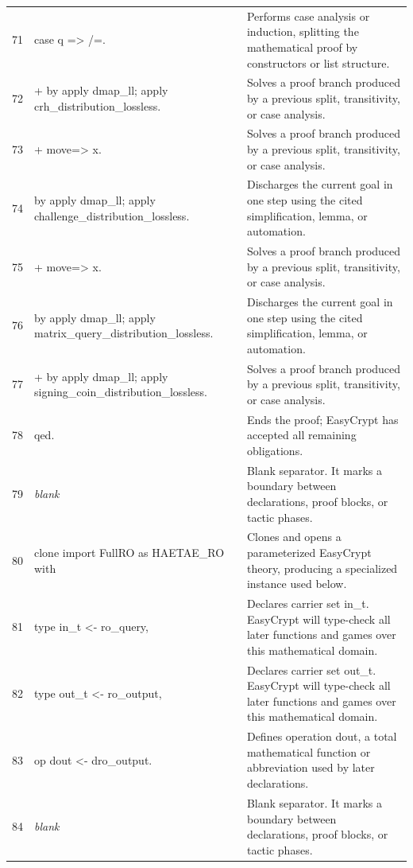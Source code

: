 \documentclass[10pt]{article}
\begin{document}
\begin{longtable}{r L{0.53\textwidth} L{0.37\textwidth}}
71 & {\ttfamily\scriptsize case q => /=.} & Performs case analysis or induction, splitting the mathematical proof by constructors or list structure. \\
72 & {\ttfamily\scriptsize + by apply dmap\_ll; apply crh\_distribution\_lossless.} & Solves a proof branch produced by a previous split, transitivity, or case analysis. \\
73 & {\ttfamily\scriptsize + move=> x.} & Solves a proof branch produced by a previous split, transitivity, or case analysis. \\
74 & {\ttfamily\scriptsize   by apply dmap\_ll; apply challenge\_distribution\_lossless.} & Discharges the current goal in one step using the cited simplification, lemma, or automation. \\
75 & {\ttfamily\scriptsize + move=> x.} & Solves a proof branch produced by a previous split, transitivity, or case analysis. \\
76 & {\ttfamily\scriptsize   by apply dmap\_ll; apply matrix\_query\_distribution\_lossless.} & Discharges the current goal in one step using the cited simplification, lemma, or automation. \\
77 & {\ttfamily\scriptsize + by apply dmap\_ll; apply signing\_coin\_distribution\_lossless.} & Solves a proof branch produced by a previous split, transitivity, or case analysis. \\
78 & {\ttfamily\scriptsize qed.} & Ends the proof; EasyCrypt has accepted all remaining obligations. \\
79 & {\ttfamily\scriptsize \emph{blank}} & Blank separator.  It marks a boundary between declarations, proof blocks, or tactic phases. \\
80 & {\ttfamily\scriptsize clone import FullRO as HAETAE\_RO with} & Clones and opens a parameterized EasyCrypt theory, producing a specialized instance used below. \\
81 & {\ttfamily\scriptsize   type in\_t <- ro\_query,} & Declares carrier set in\_t.  EasyCrypt will type-check all later functions and games over this mathematical domain. \\
82 & {\ttfamily\scriptsize   type out\_t <- ro\_output,} & Declares carrier set out\_t.  EasyCrypt will type-check all later functions and games over this mathematical domain. \\
83 & {\ttfamily\scriptsize   op dout <- dro\_output.} & Defines operation dout, a total mathematical function or abbreviation used by later declarations. \\
84 & {\ttfamily\scriptsize \emph{blank}} & Blank separator.  It marks a boundary between declarations, proof blocks, or tactic phases. \\

\end{longtable}
\end{document}
